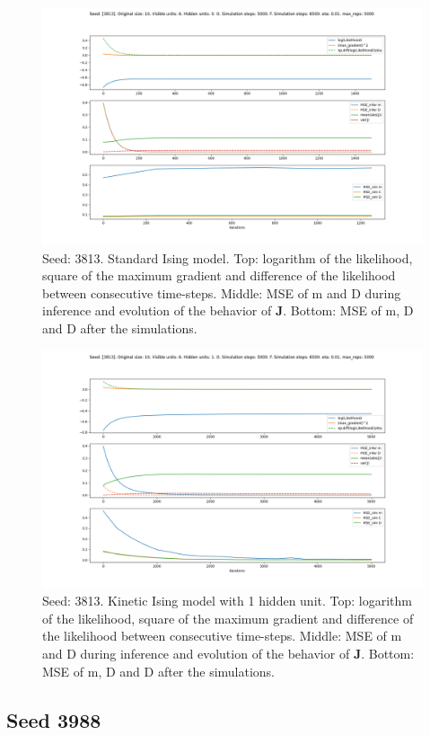 \documentclass{article}
\def\*#1{\mathbf{#1}}
\begin{document}
\begin{figure}[!htb]
    \centering
    \includegraphics[width=0.7\linewidth]{images/sqrt_size/[3813]_10_6_0_5000_6500_eta001_5000_100.png}
\caption{Seed: 3813. Standard Ising model. Top: logarithm of the likelihood, square of the maximum gradient and difference of the likelihood between consecutive time-steps. Middle: MSE of m and D during inference and evolution of the behavior of $\*J$. Bottom: MSE of m, D and D after the simulations.}
\end{figure}


\begin{figure}[!htb]
    \centering
    \includegraphics[width=0.7\linewidth]{images/sqrt_size/[3813]_10_6_1_5000_6500_eta001_5000_100.png}
\caption{Seed: 3813. Kinetic Ising model with 1 hidden unit. Top: logarithm of the likelihood, square of the maximum gradient and difference of the likelihood between consecutive time-steps. Middle: MSE of m and D during inference and evolution of the behavior of $\*J$. Bottom: MSE of m, D and D after the simulations.}
\end{figure}



\newpage
\subsection{Seed 3988}
\end{document}

